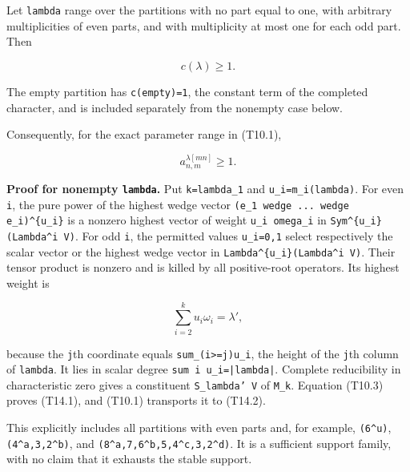 \documentclass[
  10pt,
]{article}
\begin{document}
Let \texttt{\small lambda} range over the partitions with no part equal
to one, with arbitrary multiplicities of even parts, and with
multiplicity at most one for each odd part. Then

\[
\boxed{c(\lambda)\ge1.}
\tag{T14.1}
\]

The empty partition has
\texttt{\small c(\allowbreak{}empty)\allowbreak{}=\allowbreak{}1}, the
constant term of the completed character, and is included separately
from the nonempty case below.

Consequently, for the exact parameter range in (T10.1),

\[
a_{n,m}^{\lambda[mn]}\ge1.
\tag{T14.2}
\]

\textbf{Proof for nonempty \texttt{\small lambda}.} Put
\texttt{\small k=\allowbreak{}lambda\_\allowbreak{}1} and
\texttt{\small u\_\allowbreak{}i=\allowbreak{}m\_\allowbreak{}i(\allowbreak{}lambda)\allowbreak{}}.
For even \texttt{\small i}, the pure power of the highest wedge vector
\texttt{\small (\allowbreak{}e\_\allowbreak{}1 wedge ... wedge e\_\allowbreak{}i)\allowbreak{}\textasciicircum{}\{u\_\allowbreak{}i\}}
is a nonzero highest vector of weight
\texttt{\small u\_\allowbreak{}i omega\_\allowbreak{}i} in
\texttt{\small Sym\textasciicircum{}\{u\_\allowbreak{}i\}(\allowbreak{}Lambda\textasciicircum{}i V)\allowbreak{}}.
For odd \texttt{\small i}, the permitted values
\texttt{\small u\_\allowbreak{}i=\allowbreak{}0,\allowbreak{}1} select
respectively the scalar vector or the highest wedge vector in
\texttt{\small Lambda\textasciicircum{}\{u\_\allowbreak{}i\}(\allowbreak{}Lambda\textasciicircum{}i V)\allowbreak{}}.
Their tensor product is nonzero and is killed by all positive-root
operators. Its highest weight is

\[
\sum_{i=2}^k u_i\omega_i=\lambda',
\]

because the \texttt{\small j}th coordinate equals
\texttt{\small sum\_\allowbreak{}(\allowbreak{}i>=\allowbreak{}j)\allowbreak{}u\_\allowbreak{}i},
the height of the \texttt{\small j}th column of \texttt{\small lambda}.
It lies in scalar degree
\texttt{\small sum i u\_\allowbreak{}i=\allowbreak{}|lambda|}. Complete
reducibility in characteristic zero gives a constituent
\texttt{\small S\_\allowbreak{}lambda' V} of
\texttt{\small M\_\allowbreak{}k}. Equation (T10.3) proves (T14.1), and
(T10.1) transports it to (T14.2).

This explicitly includes all partitions with even parts and, for
example,
\texttt{\small (\allowbreak{}6\textasciicircum{}u)\allowbreak{}},
\texttt{\small (\allowbreak{}4\textasciicircum{}a,\allowbreak{}3,\allowbreak{}2\textasciicircum{}b)\allowbreak{}},
and
\texttt{\small (\allowbreak{}8\textasciicircum{}a,\allowbreak{}7,\allowbreak{}6\textasciicircum{}b,\allowbreak{}5,\allowbreak{}4\textasciicircum{}c,\allowbreak{}3,\allowbreak{}2\textasciicircum{}d)\allowbreak{}}.
It is a sufficient support family, with no claim that it exhausts the
stable support.
\end{document}
